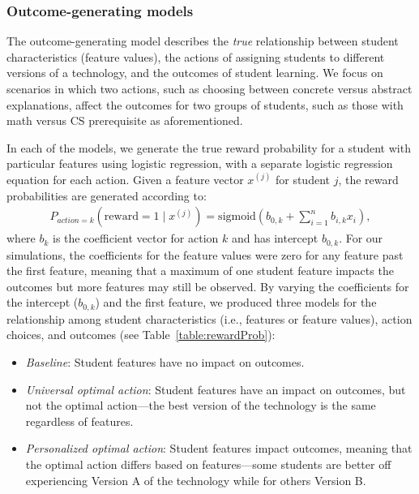 \subsubsection{Outcome-generating models}

The outcome-generating model describes the \textit{true} relationship between student characteristics (feature values), the actions of assigning students to different versions of a technology, and the outcomes of student learning. We focus on scenarios in which two actions, such as choosing between concrete versus abstract explanations, affect the outcomes for two groups of students, such as those with math versus CS prerequisite as aforementioned. 

In each of the models, we generate the true reward probability for a student with particular features using logistic regression, with a separate logistic regression equation for each action.
Given a feature vector $x^{(j)}$ for student $j$, the reward probabilities are generated according to:
\begin{align*}
  P_{action=k}(\text{reward} = 1 \mid x^{(j)}) = \text{sigmoid}(b_{0,k} + \sum_{i=1}^{n}b_{i,k}x_{i}),
\end{align*}
where $b_k$ is the coefficient vector for action $k$ and has intercept $b_{0,k}$.
For our simulations, the coefficients for the feature values were zero for any feature past the first feature, meaning that a maximum of one student feature impacts the outcomes but more features may still be observed. By varying the coefficients for the intercept ($b_{0,k}$) and the first feature, we produced three models for the relationship among student characteristics (i.e., features or feature values), action choices, and outcomes (see Table~\ref{table:rewardProb}):

\vspace{-.05in}
\begin{small}
\begin{itemize}
  \item \textit{Baseline}: Student features have no impact on outcomes.
  \item \textit{Universal optimal action}: Student features have an impact on outcomes, but not the optimal action---the best version of the technology is the same regardless of features.
  \item \textit{Personalized optimal action}: Student features impact outcomes, meaning that the optimal action differs based on features---some students are better off experiencing Version A of the technology while for others Version B.
\end{itemize}
\end{small}
\vspace{-.05in}

